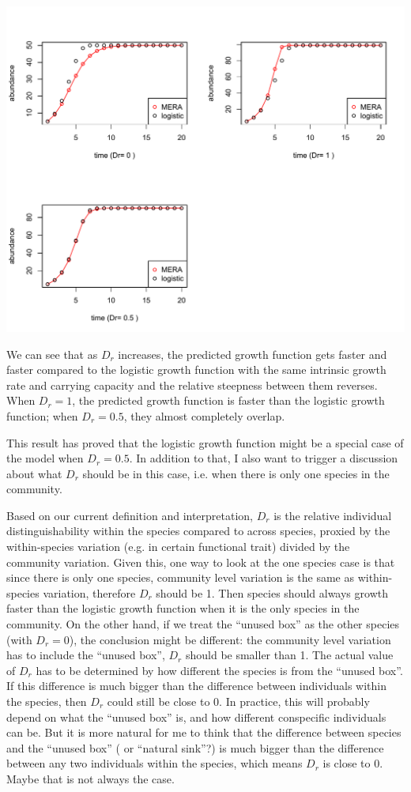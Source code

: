 \documentclass[12pt]{article}
\begin{document}
\includegraphics[width=\textwidth]{single_species_Dreffect.pdf}

We can see that as $D_r$ increases, the predicted growth function gets faster and faster compared to the logistic growth function with the same intrinsic growth rate and carrying capacity and the relative steepness between them reverses. When $D_r=1$, the predicted growth function is faster than the logistic growth function; when $D_r=0.5$, they almost completely overlap.

This result has proved that the logistic growth function might be a special case of the model when $D_r=0.5$. In addition to that, I also want to trigger a discussion about what $D_r$ should be in this case, i.e. when there is only one species in the community. 

Based on our current definition and interpretation, $D_r$ is the relative individual distinguishability within the species compared to across species, proxied by the within-species variation (e.g. in certain functional trait) divided by the community variation. Given this, one way to look at the one species case is that since there is only one species, community level variation is the same as within-species variation, therefore $D_r$ should be 1. Then species should always growth faster than the logistic growth function when it is the only species in the community. On the other hand, if we treat the ``unused box'' as the other species (with $D_r=0$), the conclusion might be different: the community level variation has to include the ``unused box'', $D_r$ should be smaller than 1. The actual value of $D_r$ has to be determined by how different the species is from the ``unused box''. If this difference is much bigger than the difference between individuals within the species, then $D_r$ could still be close to 0. In practice, this will probably depend on what the ``unused box'' is, and how different conspecific individuals can be. But it is more natural for me to think that the difference between species and the ``unused box'' ( or ``natural sink''?) is much bigger than the difference between any two individuals within the species, which means $D_r$ is close to 0. Maybe that is not always the case.
\end{document}
